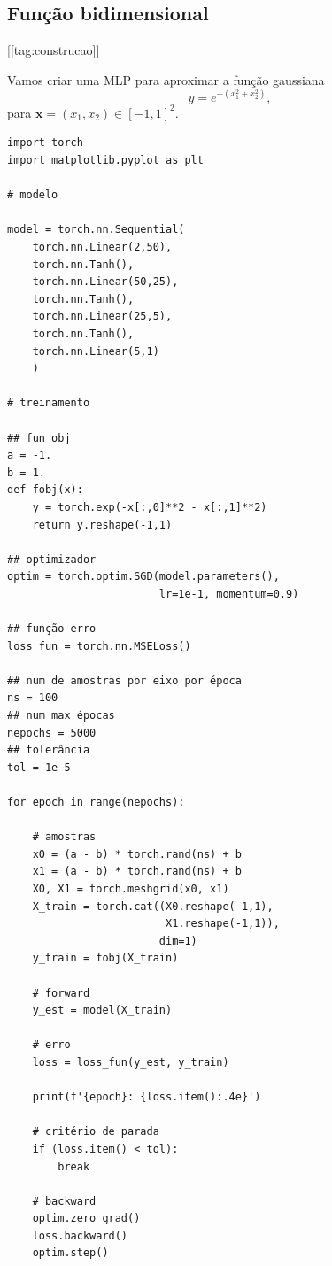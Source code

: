 \subsection{Função bidimensional}

[[tag:construcao]]

Vamos criar uma MLP para aproximar a função gaussiana
\begin{equation}
  y = e^{-(x_1^2 + x_2^2)},
\end{equation}
para $\pmb{x} = (x_1, x_2)\in [-1,1]^2$.

% 
\begin{lstlisting}
import torch
import matplotlib.pyplot as plt

# modelo

model = torch.nn.Sequential(
    torch.nn.Linear(2,50),
    torch.nn.Tanh(),
    torch.nn.Linear(50,25),
    torch.nn.Tanh(),
    torch.nn.Linear(25,5),
    torch.nn.Tanh(),
    torch.nn.Linear(5,1)
    )

# treinamento

## fun obj
a = -1.
b = 1.
def fobj(x):
    y = torch.exp(-x[:,0]**2 - x[:,1]**2)
    return y.reshape(-1,1)

## optimizador
optim = torch.optim.SGD(model.parameters(),
                        lr=1e-1, momentum=0.9)

## função erro
loss_fun = torch.nn.MSELoss()

## num de amostras por eixo por época
ns = 100
## num max épocas
nepochs = 5000
## tolerância
tol = 1e-5

for epoch in range(nepochs):

    # amostras
    x0 = (a - b) * torch.rand(ns) + b
    x1 = (a - b) * torch.rand(ns) + b
    X0, X1 = torch.meshgrid(x0, x1)
    X_train = torch.cat((X0.reshape(-1,1),
                         X1.reshape(-1,1)),
                        dim=1)
    y_train = fobj(X_train)
    
    # forward
    y_est = model(X_train)

    # erro
    loss = loss_fun(y_est, y_train)

    print(f'{epoch}: {loss.item():.4e}')

    # critério de parada
    if (loss.item() < tol):
        break

    # backward
    optim.zero_grad()
    loss.backward()
    optim.step()



\end{lstlisting}
